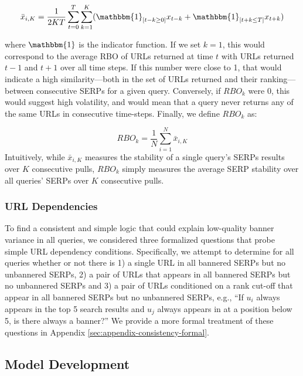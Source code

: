 {\begin{equation}
    \bar{x}_{i,K} = \frac{1}{2KT} \sum^T_{t=0} \sum^K_{k=1} (\mathbbm{1}_{[t-k \geq 0]} x_{t-k} + \mathbbm{1}_{[t+k \leq T]}x_{t+k})
\label{eq:rbosim}
\end{equation}

\noindent
where $\mathbbm{1}$ is the indicator function. If we set $k=1$, this would correspond to the average RBO of URLs returned at time $t$ with URLs returned $t-1$ and $t+1$ over all time steps. If this number were close to 1, that would indicate a high similarity---both in the set of URLs returned and their ranking---between consecutive SERPs for a given query. Conversely, if $RBO_k$ were 0, this would suggest high volatility, and would mean that a query never returns any of the same URLs in consecutive time-steps. Finally, we define $RBO_k$ as:

\begin{equation}
    RBO_k = \frac{1}{N}\sum_{i=1}^N \bar{x}_{i,K}
\label{eq:rbok}
\end{equation}
\noindent
Intuitively, while $\bar{x}_{i,K}$ measures the stability of a single query's SERPs results over $K$ consecutive pulls, $RBO_k$ simply measures the average SERP stability over all queries' SERPs over $K$ consecutive pulls.

\subsubsection{URL Dependencies}
\label{sec:methods-stability-dependency}

To find a consistent and simple logic that could explain low-quality banner variance in all queries, we considered three formalized questions that probe simple URL dependency conditions. 
Specifically, we attempt to determine for all queries whether or not there is 1) a single URL in all bannered SERPs but no unbannered SERPs, 2) a pair of URLs that appears in all bannered SERPs but no unbannered SERPs and 3) a pair of URLs conditioned on a rank cut-off that appear in all bannered SERPs but no unbannered SERPs, e.g., ``If $u_i$ always appears in the top 5 search results and $u_j$ always appears in at a position below 5, is there always a banner?'' 
We provide a more formal treatment of these questions in Appendix \ref{sec:appendix-consistency-formal}.

\subsection{Model Development}
\label{sec:methods-models}

}
